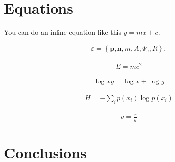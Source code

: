 \documentclass[lettersize,journal]{IEEEtran}
\begin{document}

\section{Equations}
\label{sec:eq}

You can do an inline equation like this $y = mx + c$.

    \begin{align}\label{eq:elementalobject}
      \varepsilon = \left\{ \mathbf{p}, \mathbf{n}, m, A, \Psi_\text{c}, R \right\},
    \end{align}
    
    \begin{align*}
      E = mc^2
    \end{align*}

    \begin{align*}
      \log xy = \log x + \log y
    \end{align*}
    
    \begin{align*}
      H = - \sum_i p(x_i) \log p(x_i)
    \end{align*}
    
    \begin{align*}
      v = \frac{x}{y}
    \end{align*}



\section{Conclusions}
\label{sec:conclusion}

\lipsum[3]




\end{document}
